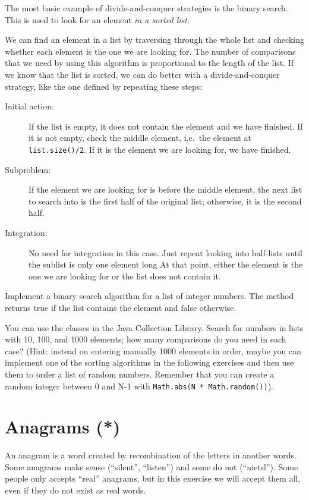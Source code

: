 \documentclass{article}
\begin{document}
The most basic example of divide-and-conquer strategies is the binary
search. This is used to look for an element \emph{in a sorted list}. 

We can find an element in a list by traversing through the whole list
and checking whether each element is the one we are looking for. The
number of comparisons that we need by using this algorithm is
proportional to the length of the list. If we know that the list is
sorted, we can do better with a divide-and-conquer strategy, 
like the one defined by repeating these steps: 

\begin{description}
\item[Initial action: ] If the list is empty, it does not contain the
  element and we have finished. 
  If it is not empty, check the middle element, i.e.~the
  element at \verb+list.size()/2+. If it is the element we are looking
  for, we have finished. 
\item[Subproblem: ] If the element we are looking for is before the
  middle element, the next list to search into is the first half of
  the original list; otherwise, it is the second half.
\item[Integration: ] No need for integration in this case. Just repeat
  looking into half-lists until the sublist is only one element long 
  At that point, either the element is the one we are looking for or
  the list does not contain it. 
\end{description}

Implement a binary search algorithm for a list of integer numbers. The
method returns true if the list contains the element and false
otherwise. 

You
can use the classes in the Java Collection Library. Search for numbers
in lists with 10, 100, and 1000 elements; how many comparisons do you
need in each case? (Hint: instead on entering manually 1000 elements
in order, maybe you can implement one of the sorting algorithms in the
following exercises and then use them to order a list of random
numbers. Remember that you can create a random integer between 0 and
N-1 with \verb+Math.abs(N * Math.random())+).

\section{Anagrams (*)}
\label{sec:anagrams}

An anagram is a word created by recombination of the letters in
another words. Some anagrams make sense (``silent'', ``listen'') and
some do not (``nietsl''). Some people only accepts ``real'' anagrams,
but in this exercise we will accept them all, even if they do not
exist as real words. 
\end{document}
